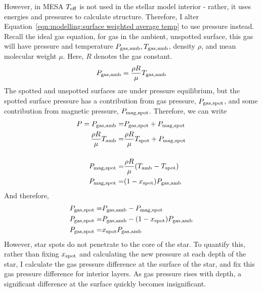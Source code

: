 However, in MESA $T_{\rm eff}$ is not used in the stellar model interior - rather, it uses energies and pressures to calculate structure. Therefore, I alter Equation~\ref{eqn:modelling:surface weighted average temp} to use pressure instead.
Recall the ideal gas equation, for gas in the ambient, unspotted surface, this gas will have pressure and temperature $P_{\rm gas, amb}, T_{\rm gas, amb}$, density $\rho$, and mean molecular weight $\mu$. Here, $R$ denotes the gas constant.
\begin{equation}
    P_{\rm gas, amb} = \frac{\rho R}{\mu} T_{\rm gas, amb}
\end{equation}
The spotted and unspotted surfaces are under pressure
equilibrium, but the spotted surface pressure has a contribution from gas pressure, $P_{\rm gas, spot}$, and some contribution from magnetic pressure, $P_{\rm mag, spot}$. Therefore, we can write
\begin{align}
    P = P_{\rm gas, amb} =& P_{\rm gas, spot} + P_{\rm mag, spot} \\
    \frac{\rho R}{\mu} T_{\rm amb} =& \frac{\rho R}{\mu} T_{\rm spot} + P_{\rm mag, spot} \\[12pt]
    P_{\rm mag, spot} =& \frac{\rho R}{\mu} (T_{\rm amb} - T_{\rm spot}) \\
    P_{\rm mag, spot} =& (1-x_{\rm spot}) P_{\rm gas, amb} \\
\end{align}
And therefore,
\begin{align}
    P_{\rm gas, spot} =& P_{\rm gas, amb} - P_{\rm mag, spot}\\
    P_{\rm gas, spot} =& P_{\rm gas, amb} - (1-x_{\rm spot}) P_{\rm gas, amb} \\
    P_{\rm gas, spot} =& x_{\rm spot} P_{\rm gas, amb}
\end{align}
However, star spots do not penetrate to the core of the star. To quantify this, rather than fixing $x_{\rm spot}$ and calculating the new pressure at each depth of the star, I calculate the gas pressure difference at the surface of the star, and fix this gas pressure difference for interior layers.
As gas pressure rises with depth, a significant difference at the surface quickly becomes insignificant.
